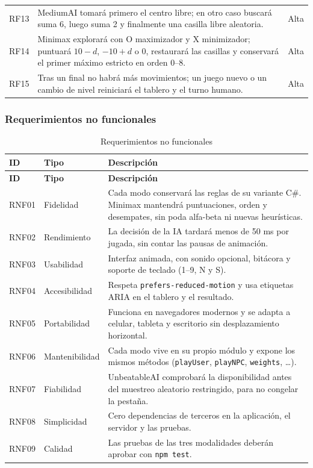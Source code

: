 \documentclass[12pt,a4paper]{article}
\begin{document}
\begin{longtable}{p{1.3cm}p{9.2cm}p{2.6cm}}
RF13 & MediumAI tomará primero el centro libre; en otro caso buscará suma 6, luego suma 2 y finalmente una casilla libre aleatoria. & Alta\\
RF14 & Minimax explorará con O maximizador y X minimizador; puntuará $10-d$, $-10+d$ o 0, restaurará las casillas y conservará el primer máximo estricto en orden 0--8. & Alta\\
RF15 & Tras un final no habrá más movimientos; un juego nuevo o un cambio de nivel reiniciará el tablero y el turno humano. & Alta\\
\bottomrule
\end{longtable}

\subsubsection{Requerimientos no funcionales}
\begin{longtable}{p{1.3cm}p{2.9cm}p{9.2cm}}
\caption{Requerimientos no funcionales}\\
\toprule
\textbf{ID} & \textbf{Tipo} & \textbf{Descripción}\\
\midrule\endfirsthead
\toprule
\textbf{ID} & \textbf{Tipo} & \textbf{Descripción}\\
\midrule\endhead
RNF01 & Fidelidad & Cada modo conservará las reglas de su variante C\#. Minimax mantendrá puntuaciones, orden y desempates, sin poda alfa-beta ni nuevas heurísticas.\\
RNF02 & Rendimiento & La decisión de la IA tardará menos de 50 ms por jugada, sin contar las pausas de animación.\\
RNF03 & Usabilidad & Interfaz animada, con sonido opcional, bitácora y soporte de teclado (1--9, N y S).\\
RNF04 & Accesibilidad & Respeta \texttt{prefers-reduced-motion} y usa etiquetas ARIA en el tablero y el resultado.\\
RNF05 & Portabilidad & Funciona en navegadores modernos y se adapta a celular, tableta y escritorio sin desplazamiento horizontal.\\
RNF06 & Mantenibilidad & Cada modo vive en su propio módulo y expone los mismos métodos (\texttt{playUser}, \texttt{playNPC}, \texttt{weights}, \ldots).\\
RNF07 & Fiabilidad & UnbeatableAI comprobará la disponibilidad antes del muestreo aleatorio restringido, para no congelar la pestaña.\\
RNF08 & Simplicidad & Cero dependencias de terceros en la aplicación, el servidor y las pruebas.\\
RNF09 & Calidad & Las pruebas de las tres modalidades deberán aprobar con \texttt{npm test}.\\
\bottomrule
\end{longtable}
\end{document}
